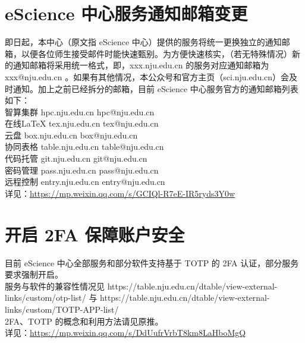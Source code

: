 \documentclass[letterpaper, 12pt]{article}
\begin{document}
\begin{multicols}{2}
\section{eScience 中心服务通知邮箱变更} %
即日起，本中心（原文指 eScience 中心）提供的服务将统一更换独立的通知邮箱，以便各位师生接受邮件时能快速甄别。为方便快速核实，（若无特殊情况）新的通知邮箱将采用统一格式，即，xxx.nju.edu.cn 的服务对应通知邮箱为 xxx@nju.edu.cn 。如果有其他情况，本公众号和官方主页（sci.nju.edu.cn）会及时通知。加上之前已经拆分的邮箱，目前 eScience 中心服务官方的通知邮箱列表如下：
\\智算集群 hpc.nju.edu.cn hpc@nju.edu.cn
\\在线LaTeX tex.nju.edu.cn tex@nju.edu.cn
\\云盘 box.nju.edu.cn box@nju.edu.cn
\\协同表格 table.nju.edu.cn table@nju.edu.cn
\\代码托管 git.nju.edu.cn git@nju.edu.cn
\\密码管理 pass.nju.edu.cn pass@nju.edu.cn
\\远程控制 entry.nju.edu.cn entry@nju.edu.cn
\\详见：\url{https://mp.weixin.qq.com/s/GCIQl-R7eE-IR5ryds3Y0w}

\section{开启 2FA 保障账户安全} %
目前 eScience 中心全部服务和部分软件支持基于 TOTP 的 2FA 认证，部分服务要求强制开启。
\\服务与软件的兼容性情况见 https://table.nju.edu.cn/dtable/view-external-links/custom/otp-list/ 与 https://table.nju.edu.cn/dtable/view-external-links/custom/TOTP-APP-list/
\\2FA、TOTP 的概念和利用方法请见原推。
\\详见：\url{https://mp.weixin.qq.com/s/DdUufrVrbT8km8LaHboMgQ}



\end{multicols}
\end{document}
